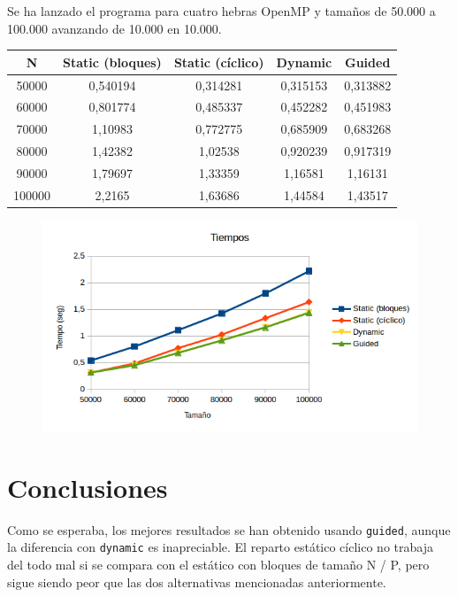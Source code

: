 Se ha lanzado el programa para cuatro hebras OpenMP y tamaños de 50.000 a 100.000 avanzando de 10.000 en 10.000.

\begin{center}
\begin{tabular}{ | c | c c c c | }
	\hline 
	N		&	Static (bloques)	&	Static (cíclico)	&	Dynamic		&	Guided		\\
	\hline
	50000	&	0,540194			&	0,314281			&	0,315153	&	0,313882	\\
	60000	&	0,801774			&	0,485337			&	0,452282	&	0,451983	\\
	70000	&	1,10983				&	0,772775			&	0,685909	&	0,683268	\\
	80000	&	1,42382				&	1,02538				&	0,920239	&	0,917319	\\
	90000	&	1,79697				&	1,33359				&	1,16581		&	1,16131		\\
	100000	&	2,2165				&	1,63686				&	1,44584		&	1,43517		\\
	\hline
\end{tabular}
\end{center}

\begin{figure}[H]
	\centering
	\includegraphics[width=12cm]{resultados/tiempos}
\end{figure}

\section{Conclusiones}

Como se esperaba, los mejores resultados se han obtenido usando \texttt{guided}, aunque la diferencia con \texttt{dynamic} es inapreciable. El reparto estático cíclico no trabaja del todo mal si se compara con el estático con bloques de tamaño N / P, pero sigue siendo peor que las dos alternativas mencionadas anteriormente.

